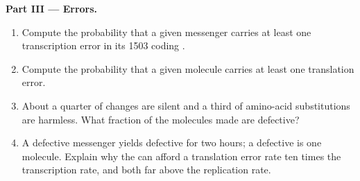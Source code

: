 \begin{problem}
\medskip
\noindent\textbf{Part III --- Errors.}
\begin{enumerate}[resume]
  \item Compute the probability that a given messenger carries at
        least one transcription error in its \qty{1503}{} coding
        .
  \item Compute the probability that a given  molecule carries
        at least one translation error.
  \item About a quarter of  changes are silent and a third
        of amino-acid substitutions are harmless. What fraction of
        the  molecules made are defective?
  \item A defective messenger yields defective  for two
        hours; a defective  is one molecule. Explain why the
         can afford a translation error rate ten times the
        transcription rate, and both far above the replication rate.
\end{enumerate}


\end{problem}

